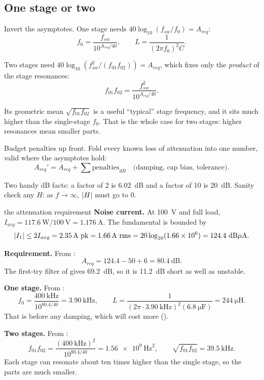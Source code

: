 \subsection{One stage or two}

Invert the asymptotes. One stage needs $40\log_{10}(f_{sw}/f_0) = A_{req}$:
\begin{equation}\label{eq:one-stage-size}
	f_0 = \frac{f_{sw}}{10^{A_{req}/40}}, \qquad L = \frac{1}{(2\pi f_0)^2 C}.
\end{equation}

Two stages need $40\log_{10}(f_{sw}^2/(f_{01}f_{02})) = A_{req}$, which fixes
only the \emph{product} of the stage resonances:
\begin{equation}\label{eq:two-stage-size}
	f_{01}f_{02} = \frac{f_{sw}^2}{10^{A_{req}/40}}.
\end{equation}

Its geometric mean $\sqrt{f_{01}f_{02}}$ is a useful ``typical'' stage
frequency, and it sits much higher than the single-stage $f_0$. That is the
whole case for two stages: higher resonances mean smaller parts.

\begin{idea}
	Budget penalties up front. Fold every known loss of attenuation into one number,
	valid where the asymptotes hold:
	\[
		A_{req}' = A_{req} + \sum \text{penalties}_{dB}
		\quad \text{(damping, cap bias, tolerance)}.
	\]
\end{idea}

Two handy dB facts: a factor of 2 is 6.02~dB and a factor of 10 is 20~dB.
Sanity check any $H$: as $f \to \infty$, $\lvert H\rvert$ must go to 0.

\begin{examplebox}[label=ex:requirement]{the attenuation requirement}
	\textbf{Noise current.} At \qty{100}{\volt} and full load,
	$I_{avg} = \qty{117.6}{\watt}/\qty{100}{\volt} = \qty{1.176}{\ampere}$.
	The fundamental is bounded by
	\[
		\lvert I_1\rvert \leq 2I_{avg} = \qty{2.35}{\ampere}~\text{pk}
		= \qty{1.66}{\ampere}~\text{rms}
		= 20\log_{10}(1.66\times 10^{6}) = 124.4~\text{dB$\mu$A}.
	\]

	\textbf{Requirement.} From :
	\[
		A_{req} = 124.4 - 50 + 6 = 80.4~\text{dB}.
	\]
	The first-try filter of  gives 69.2~dB, so it is
	11.2~dB short as well as unstable.

	\textbf{One stage.} From :
	\[
		f_0 = \frac{\qty{400}{\kHz}}{10^{80.4/40}} = \qty{3.90}{\kHz},
		\qquad
		L = \frac{1}{(2\pi \cdot \qty{3.90}{\kHz})^2(\qty{6.8}{\micro\farad})} = \qty{244}{\micro\henry}.
	\]
	That is before any damping, which will cost more ().

	\textbf{Two stages.} From :
	\[
		f_{01}f_{02} = \frac{(\qty{400}{\kHz})^2}{10^{80.4/40}} = \qty{1.56e9}{\hertz\squared},
		\qquad \sqrt{f_{01}f_{02}} = \qty{39.5}{\kHz}.
	\]
	Each stage can resonate about ten times higher than the single stage, so
	the parts are much smaller.
\end{examplebox}
